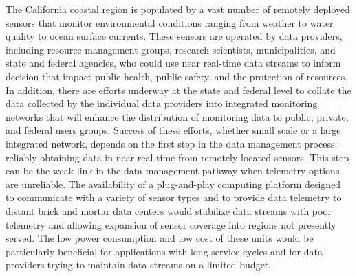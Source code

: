 \documentclass[conference]{IEEEtran}
\begin{document}
The California coastal region is populated by a vast number of
remotely deployed sensors that monitor environmental conditions
ranging from weather to water quality to ocean surface currents.
These sensors are operated by data providers, including resource
management groups, research scientists, municipalities, and state and
federal agencies, who could use near real-time data streams to inform
decision that impact public health, public safety, and the protection
of resources.  In addition, there are efforts underway at the state
and federal level to collate the data collected by the individual data
providers into integrated monitoring networks that will enhance the
distribution of monitoring data to public, private, and federal users
groups.  Success of these efforts, whether small scale or a large
integrated network, depends on the first step in the data management
process: reliably obtaining data in near real-time from remotely
located sensors.  This step can be the weak link in the data
management pathway when telemetry options are unreliable.  The
availability of a plug-and-play computing platform designed to
communicate with a variety of sensor types and to provide data
telemetry to distant brick and mortar data centers would stabilize
data streams with poor telemetry and allowing expansion of sensor
coverage into regions not presently served.  The low power consumption
and low cost of these units would be particularly beneficial for
applications with long service cycles and for data providers trying to
maintain data streams on a limited budget.



\end{document}
